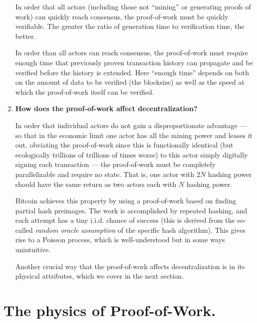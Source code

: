 \documentclass[letterpaper]{article}
\theoremstyle{xxx}
\theoremstyle{evil}
\theoremstyle{yyy}
\theoremstyle{plain}
\theoremstyle{zzz}
\begin{document}
\begin{enumerate}
In order that all actors (including those not ``mining'' or generating proofs
of work) can quickly reach consensus, the proof-of-work must be quickly
verifiable. The greater the ratio of generation time to verification time,
the better.

In order than all actors can reach consensus, the proof-of-work must require
enough time that previously proven transaction history can propagate and be
verified before the history is extended. Here ``enough time'' depends on
both on the amount of data to be verified (the blocksize) as well as the
speed at which the proof-of-work itself can be verified.

\item \textbf{How does the proof-of-work affect decentralization?}

In order that individual actors do not gain a disproportionate advantage ---
so that in the economic limit one actor has all the mining power and
leases it out, obviating the proof-of-work since this is functionally
identical (but ecologically trillions of trillions of times worse) to
this actor simply digitally signing each transaction --- the proof-of-work
must be completely parallelizable and require no state. That is, one actor
with $2N$ hashing power should have the same return as two actors each with
$N$ hashing power.

Bitcoin achieves this property by using a proof-of-work based on finding
partial hash preimages. The work is accomplished by repeated hashing, and
each attempt has a tiny i.i.d. chance of success (this is derived from the
so-called \emph{random oracle assumption} of the specific hash algorithm).
This gives rise to a Poisson process, which is well-understood but in some
ways unintuitive.

Another crucial way that the proof-of-work affects decentralization is
in its physical attributes, which we cover in the next section.
\end{enumerate}

\section{The physics of Proof-of-Work.}
\end{document}
